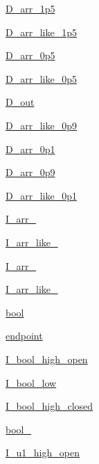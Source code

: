 \begin{DoxyCompactItemize}
\hyperlink{namespacerandom_ac36c23491a6200716ca1637d66b34fcf}{D\+\_\+arr\+\_\+1p5}
\item 
\hyperlink{namespacerandom_a5a89cb1129fc86339410d20ccf7b3a8c}{D\+\_\+arr\+\_\+like\+\_\+1p5}
\item 
\hyperlink{namespacerandom_a10ff67a22abd16125f2de1b2036a2867}{D\+\_\+arr\+\_\+0p5}
\item 
\hyperlink{namespacerandom_a2230f22aa9dc531525bd40fcbf868767}{D\+\_\+arr\+\_\+like\+\_\+0p5}
\item 
\hyperlink{namespacerandom_aa3bde5e2d976ebaff8f44ee188bdbc6f}{D\+\_\+out}
\item 
\hyperlink{namespacerandom_ae32566cf24c5bd6ec4adde830e4f1076}{D\+\_\+arr\+\_\+like\+\_\+0p9}
\item 
\hyperlink{namespacerandom_a4966ff8f7e7a35982d39bdab391d8820}{D\+\_\+arr\+\_\+0p1}
\item 
\hyperlink{namespacerandom_af9dd2ab97d7092688da4accebc842655}{D\+\_\+arr\+\_\+0p9}
\item 
\hyperlink{namespacerandom_a1fc2b89661bd2cf77f9ac3c123922a58}{D\+\_\+arr\+\_\+like\+\_\+0p1}
\item 
\hyperlink{namespacerandom_a1b14394e7f3570127cd54300aa70bf5d}{I\+\_\+arr\+\_}
\item 
\hyperlink{namespacerandom_af691ebe1c4961134aba00aa990b3541a}{I\+\_\+arr\+\_\+like\+\_}
\item 
\hyperlink{namespacerandom_a3ef64082bdc2016c4302d7b55abd72ed}{I\+\_\+arr\+\_}
\item 
\hyperlink{namespacerandom_aa7fe0794d5aa2f3bd79446216df4d801}{I\+\_\+arr\+\_\+like\+\_}
\item 
\hyperlink{namespacerandom_abcd0015f1510b1756ebdbdc12a49a150}{bool}
\item 
\hyperlink{namespacerandom_a0af8c3c4e3a2be3f2c376adb59ec07c1}{endpoint}
\item 
\hyperlink{namespacerandom_a2a3fcc5bb9e8d21ae9bfe2b747218af3}{I\+\_\+bool\+\_\+high\+\_\+open}
\item 
\hyperlink{namespacerandom_a2a619eb4c3a2a56b3cd10c07a1c2d7ac}{I\+\_\+bool\+\_\+low}
\item 
\hyperlink{namespacerandom_aa00cb783948222098a0aeac987b50d69}{I\+\_\+bool\+\_\+high\+\_\+closed}
\item 
\hyperlink{namespacerandom_af85ccbfd79aaa06751410d5ddb8645b2}{bool\+\_\+}
\item 
\hyperlink{namespacerandom_a10575da1b427f504b5edad4a10a9d155}{I\+\_\+u1\+\_\+high\+\_\+open}

\end{DoxyCompactItemize}
